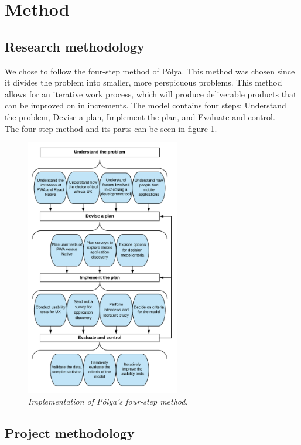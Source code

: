 \section{Method}

\subsection{Research methodology}
We chose to follow the four-step method of Pólya. This method was chosen since it divides the problem into smaller, more perspicuous problems. This method allows for an iterative work process, which will produce deliverable products that can be improved on in increments. The model contains four steps: Understand the problem, Devise a plan, Implement the plan, and Evaluate and control. \\
The four-step method and its parts can be seen in figure \ref{fig:project-polya}.

\begin{figure}[ht]
	\centering 
    \includegraphics[width=0.6\textwidth]{img/Polya.png}
	\hfill
	\caption{\textit{Implementation of Pólya's four-step method.}}
		\label{fig:project-polya}
\end{figure}

\subsection{Project methodology}


